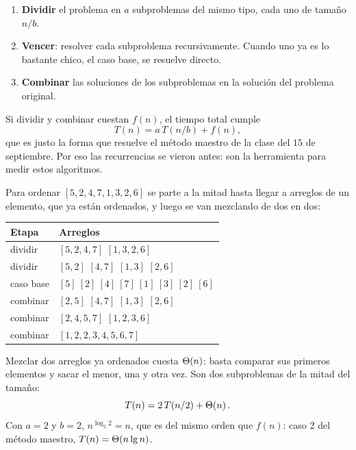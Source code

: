 \documentclass[11pt,letterpaper]{article}
\begin{document}
\begin{enumerate}[itemsep=0.3em]
  \item \textbf{Dividir} el problema en $a$ subproblemas del mismo
        tipo, cada uno de tamaño $n/b$.
  \item \textbf{Vencer}: resolver cada subproblema recursivamente.
        Cuando uno ya es lo bastante chico, el caso base, se resuelve
        directo.
  \item \textbf{Combinar} las soluciones de los subproblemas en la
        solución del problema original.
\end{enumerate}

Si dividir y combinar cuestan $f(n)$, el tiempo total cumple
\[
  T(n) = a\, T(n/b) + f(n) ,
\]
que es justo la forma que resuelve el método maestro de la clase del
$15$ de septiembre. Por eso las recurrencias se vieron antes: son la
herramienta para medir estos algoritmos.

\begin{ejemplo}
  Para ordenar $[5, 2, 4, 7, 1, 3, 2, 6]$ se parte a la mitad hasta
  llegar a arreglos de un elemento, que ya están ordenados, y luego se
  van mezclando de dos en dos:
  \begin{center}
  \begin{tabular}{ll}
    \toprule
    \textbf{Etapa} & \textbf{Arreglos} \\
    \midrule
    dividir    & $[5, 2, 4, 7]$ \quad $[1, 3, 2, 6]$ \\
    dividir    & $[5, 2]$ \quad $[4, 7]$ \quad $[1, 3]$ \quad $[2, 6]$ \\
    caso base  & $[5]\ [2]\ [4]\ [7]\ [1]\ [3]\ [2]\ [6]$ \\
    combinar   & $[2, 5]$ \quad $[4, 7]$ \quad $[1, 3]$ \quad $[2, 6]$ \\
    combinar   & $[2, 4, 5, 7]$ \quad $[1, 2, 3, 6]$ \\
    combinar   & $[1, 2, 2, 3, 4, 5, 6, 7]$ \\
    \bottomrule
  \end{tabular}
  \end{center}
  Mezclar dos arreglos ya ordenados cuesta $\Theta\!\left(n\right)$: basta comparar
  sus primeros elementos y sacar el menor, una y otra vez. Son dos
  subproblemas de la mitad del tamaño:
  \[
    T(n) = 2\, T(n/2) + \Theta\!\left(n\right) .
  \]
  Con $a = 2$ y $b = 2$, $n^{\log_2 2} = n$, que es del mismo orden
  que $f(n)$: caso 2 del método maestro, $T(n) = \Theta\!\left(n \lg n\right)$.
\end{ejemplo}
\end{document}
